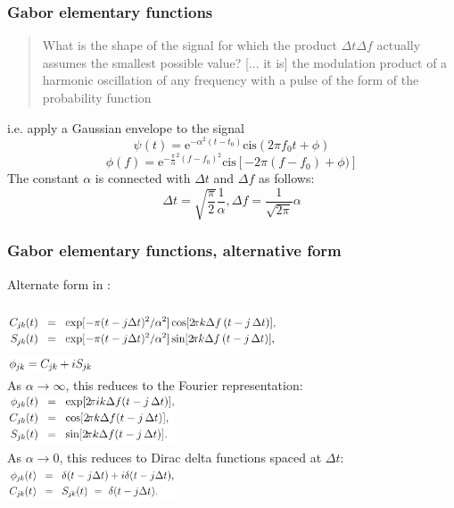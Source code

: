 \documentclass{beamer}
\begin{document}
\begin{frame}
	\frametitle{Gabor elementary functions}
	\begin{quote}
		What is the shape of the signal for which the product $\Delta t\Delta f$ actually assumes the smallest possible value? [... it is] the  modulation product of a harmonic oscillation of any frequency with a pulse of the form of the probability function
	\end{quote}
	i.e. apply a Gaussian envelope to the signal\\
	\[ \psi(t) = \text{e}^{-\alpha^{2}(t-t_{0})}\text{cis}(2\pi f_{0}t + \phi) \]
	\[ \phi(f) = \text{e}^{-\frac{\pi}{\alpha}^{2}(f-f_{0})^{2}}\text{cis}[-2\pi(f - f_{0}) + \phi)] \]
	The constant $\alpha$ is connected with $\Delta t$ and $\Delta f$ as follows:
	\[ \Delta t = \sqrt{\frac{\pi}{2}}\frac{1}{\alpha}, \Delta f = \frac{1}{\sqrt{2\pi}}\alpha \]
\end{frame}


\begin{frame}
	\frametitle{Gabor elementary functions, alternative form}
	Alternate form in \cite{gabor2}:\\\ \\
	\includegraphics[width=8cm]{./gaboralt1.png}\\
	\vspace{-0.5em}
	\includegraphics[width=2.5cm]{./gaboralt2.png}\\
	As $\alpha \rightarrow \infty$, this reduces to the Fourier representation:
	\includegraphics[width=5cm]{./gaboralt3.png}\\
	As $\alpha \rightarrow 0$, this reduces to Dirac delta functions spaced at $\Delta t$:
	\includegraphics[width=5cm]{./gaboralt4.png}
\end{frame}
\end{document}
